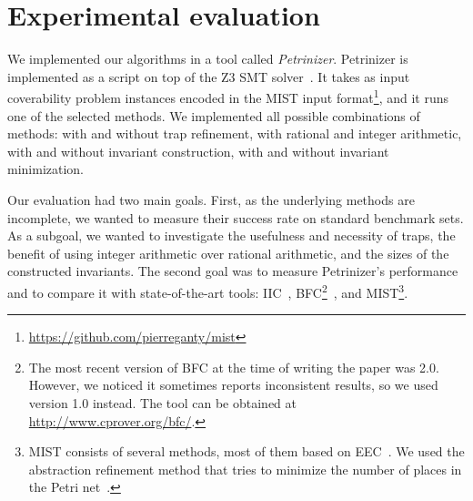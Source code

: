 \chapter{Experimental evaluation}
\label{chap:experimental_evaluation}

We implemented our algorithms in a tool called
\emph{Pe\-tri\-ni\-zer}. 
Petrinizer is implemented as a script on top of the 
Z3 SMT solver~\cite{MouraB08}.
It takes as input coverability problem instances encoded in the MIST
input format\footnote{\url{https://github.com/pierreganty/mist}}, and it
runs one of the selected methods. 
We implemented all possible combinations of
methods: with and without trap refinement, with rational and integer arithmetic,
with and without invariant construction, with and without invariant
minimization.

Our evaluation had two main goals. First, as the underlying
methods are incomplete, we wanted to measure their success rate on standard
benchmark sets. 
As a subgoal, we wanted to investigate
the usefulness and necessity of traps, the benefit of using integer arithmetic
over rational arithmetic, and the sizes of the constructed invariants.
The second goal was to measure Petrinizer's performance and to compare it
with state-of-the-art tools: 
IIC~\cite{KloosMNP13}, BFC\footnote{The most recent version of BFC at the time of
writing the paper was 2.0. However, we noticed it sometimes reports
inconsistent results, so we used version 1.0 instead. The tool can be
obtained at \url{http://www.cprover.org/bfc/}.}~\cite{KaiserKW12}, and
MIST\footnote{MIST consists of several methods, most of them based on
  EEC~\cite{GeeraertsRB06}. We used the abstraction
  refinement method that tries to minimize the number of places in the
  Petri net~\cite{GantyRB08}.}.

